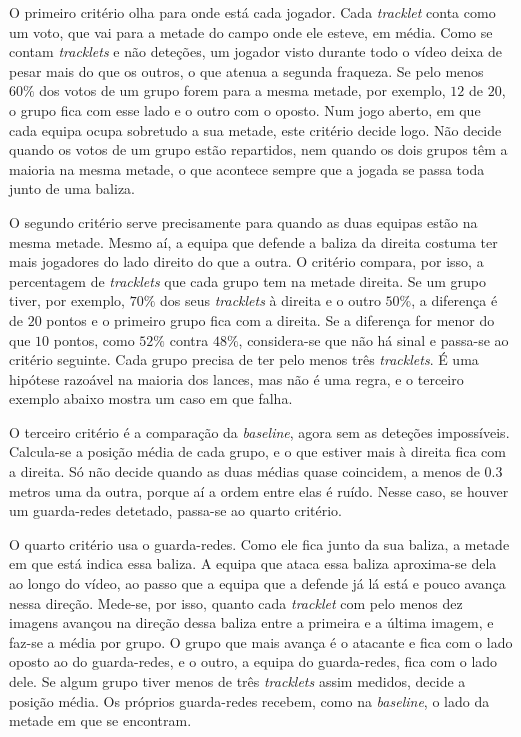O primeiro critério olha para onde está cada jogador. Cada \emph{tracklet} conta como um voto, que vai para a metade do campo onde ele esteve, em média. Como se contam \emph{tracklets} e não deteções, um jogador visto durante todo o vídeo deixa de pesar mais do que os outros, o que atenua a segunda fraqueza. Se pelo menos $60\%$ dos votos de um grupo forem para a mesma metade, por exemplo, $12$ de $20$, o grupo fica com esse lado e o outro com o oposto. Num jogo aberto, em que cada equipa ocupa sobretudo a sua metade, este critério decide logo. Não decide quando os votos de um grupo estão repartidos, nem quando os dois grupos têm a maioria na mesma metade, o que acontece sempre que a jogada se passa toda junto de uma baliza.

O segundo critério serve precisamente para quando as duas equipas estão na mesma metade. Mesmo aí, a equipa que defende a baliza da direita costuma ter mais jogadores do lado direito do que a outra. O critério compara, por isso, a percentagem de \emph{tracklets} que cada grupo tem na metade direita. Se um grupo tiver, por exemplo, $70\%$ dos seus \emph{tracklets} à direita e o outro $50\%$, a diferença é de $20$ pontos e o primeiro grupo fica com a direita. Se a diferença for menor do que $10$ pontos, como $52\%$ contra $48\%$, considera-se que não há sinal e passa-se ao critério seguinte. Cada grupo precisa de ter pelo menos três \emph{tracklets}. É uma hipótese razoável na maioria dos lances, mas não é uma regra, e o terceiro exemplo abaixo mostra um caso em que falha.

O terceiro critério é a comparação da \emph{baseline}, agora sem as deteções impossíveis. Calcula-se a posição média de cada grupo, e o que estiver mais à direita fica com a direita. Só não decide quando as duas médias quase coincidem, a menos de $0.3$ metros uma da outra, porque aí a ordem entre elas é ruído. Nesse caso, se houver um guarda-redes detetado, passa-se ao quarto critério.

O quarto critério usa o guarda-redes. Como ele fica junto da sua baliza, a metade em que está indica essa baliza. A equipa que ataca essa baliza aproxima-se dela ao longo do vídeo, ao passo que a equipa que a defende já lá está e pouco avança nessa direção. Mede-se, por isso, quanto cada \emph{tracklet} com pelo menos dez imagens avançou na direção dessa baliza entre a primeira e a última imagem, e faz-se a média por grupo. O grupo que mais avança é o atacante e fica com o lado oposto ao do guarda-redes, e o outro, a equipa do guarda-redes, fica com o lado dele. Se algum grupo tiver menos de três \emph{tracklets} assim medidos, decide a posição média. Os próprios guarda-redes recebem, como na \emph{baseline}, o lado da metade em que se encontram.

